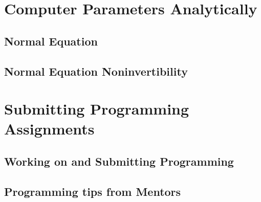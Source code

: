 \documentclass{article}
\begin{document}
\begin{CJK}{UTF8}{gbsn}
\section{Computer Parameters Analytically}

\subsection{Normal Equation}

\subsection{Normal Equation Noninvertibility}

\section{Submitting Programming Assignments}

\subsection{Working on and Submitting  Programming}

\subsection{Programming tips from Mentors}

\end{CJK}
\end{document}
